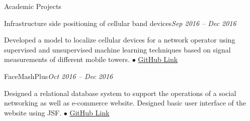 \documentclass{resume} %
\begin{document}
\begin{rSection}{Academic Projects}
\begin{rSubsection}{Infrastructure side positioning of cellular band devices}{\emph{Sep 2016 -- Dec 2016}}{}{}
\item Developed a model to localize cellular devices for a network operator using supervised and unsupervised machine learning techniques based on signal measurements of different mobile towers.
{\tiny$\bullet$}
\href{https://github.com/t-lohani/Netwok-side-Localization}{GitHub Link}
\end{rSubsection}


\begin{rSubsection}{FaceMashPlus}{\emph{Oct 2016 -- Dec 2016}}{}{}
\item Designed a relational database system to support the operations of a social networking as well as e-commerce website. Designed basic user interface of the website using JSF.
{\tiny$\bullet$}
\href{https://github.com/t-lohani/Facemash-Plus}{GitHub Link}
\end{rSubsection}

\end{rSection}
\end{document}
